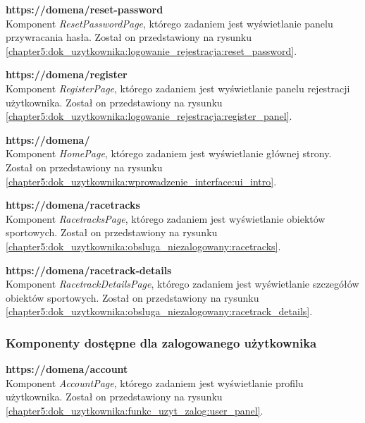 \documentclass[../Kamil_Kowalewski_Main.tex]{subfiles}
\begin{document}
{{{{                \noindent\textbf{https://domena/reset-password}\\
                \indent Komponent \textit{ResetPasswordPage}, którego zadaniem jest
                wyświetlanie panelu przywracania hasła. Został on przedstawiony na
                rysunku
                \ref{chapter5:dok_uzytkownika:logowanie_rejestracja:reset_password}.

                \noindent\textbf{https://domena/register}\\
                \indent Komponent \textit{RegisterPage}, którego zadaniem jest wyświetlanie
                panelu rejestracji użytkownika. Został on przedstawiony na rysunku
                \ref{chapter5:dok_uzytkownika:logowanie_rejestracja:register_panel}.

                \noindent\textbf{https://domena/}\\
                \indent Komponent \textit{HomePage}, którego zadaniem jest wyświetlanie
                głównej strony. Został on przedstawiony na rysunku
                \ref{chapter5:dok_uzytkownika:wprowadzenie_interface:ui_intro}.

                \noindent\textbf{https://domena/racetracks}\\
                \indent Komponent \textit{RacetracksPage}, którego zadaniem jest
                wyświetlanie obiektów sportowych. Został on przedstawiony na rysunku
                \ref{chapter5:dok_uzytkownika:obsluga_niezalogowany:racetracks}.

                \noindent\textbf{https://domena/racetrack-details}\\
                \indent Komponent \textit{RacetrackDetailsPage}, którego zadaniem jest
                wyświetlanie szczegółów obiektów sportowych. Został on przedstawiony
                na rysunku
                \ref{chapter5:dok_uzytkownika:obsluga_niezalogowany:racetrack_details}.
            }

            \subsubsection{Komponenty dostępne dla zalogowanego użytkownika}
            \label{chapter4:dok_techniczna:implementacja:struktura_stron:zalogowany} {

                \noindent\textbf{https://domena/account}\\
                \indent Komponent \textit{AccountPage}, którego zadaniem jest wyświetlanie
                profilu użytkownika. Został on przedstawiony na rysunku
                \ref{chapter5:dok_uzytkownika:funkc_uzyt_zalog:user_panel}.

}}}}
\end{document}

